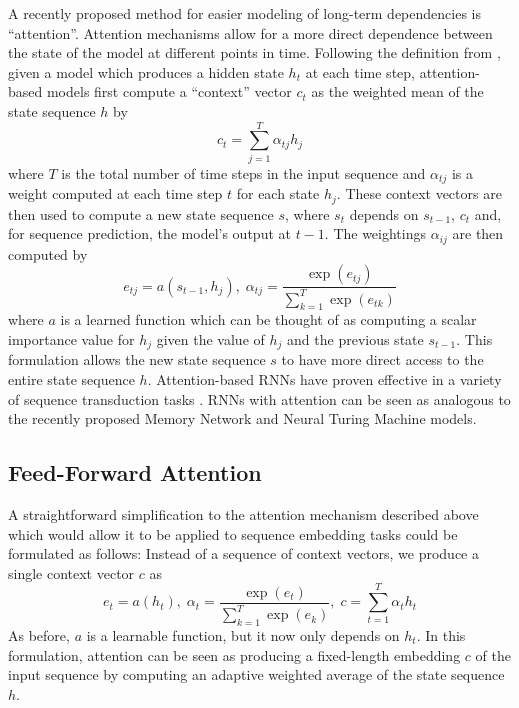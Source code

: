 \documentclass{article} %
\begin{document}
A recently proposed method for easier modeling of long-term dependencies is ``attention''.
Attention mechanisms allow for a more direct dependence between the state of the model at different points in time.
Following the definition from \cite{bahdanau2014neural}, given a model which produces a hidden state $h_t$ at each time step, attention-based models first compute a ``context'' vector $c_t$ as the weighted mean of the state sequence $h$ by
$$
c_t = \sum_{j = 1}^T \alpha_{tj} h_j
$$
where $T$ is the total number of time steps in the input sequence and $\alpha_{tj}$ is a weight computed at each time step $t$ for each state $h_j$.
These context vectors are then used to compute a new state sequence $s$, where $s_t$ depends on $s_{t - 1}$, $c_t$ and, for sequence prediction, the model's output at $t - 1$.
The weightings $\alpha_{ij}$ are then computed by
$$
e_{tj} = a(s_{t - 1}, h_j),\; \alpha_{tj} = \frac{\exp(e_{tj})}{\sum_{k = 1}^T \exp(e_{tk})}
$$
where $a$ is a learned function which can be thought of as computing a scalar importance value for $h_j$ given the value of $h_j$ and the previous state $s_{t - 1}$.
This formulation allows the new state sequence $s$ to have more direct access to the entire state sequence $h$.
Attention-based RNNs have proven effective in a variety of sequence transduction tasks \cite{bahdanau2014neural,cho2015describing}.
RNNs with attention can be seen as analogous to the recently proposed Memory Network \cite{weston2014memory,sukhbaatar2015end} and Neural Turing Machine \cite{graves2014neural} models.

\subsection{Feed-Forward Attention}

A straightforward simplification to the attention mechanism described above which would allow it to be applied to sequence embedding tasks could be formulated as follows:
Instead of a sequence of context vectors, we produce a single context vector $c$ as
\begin{equation}
\label{eq:ffattention}
 e_t = a(h_t),\; \alpha_t = \frac{\exp(e_t)}{\sum_{k = 1}^T \exp(e_k)}, \; c = \sum_{t = 1}^T \alpha_t h_t
\end{equation}
As before, $a$ is a learnable function, but it now only depends on $h_t$.
In this formulation, attention can be seen as producing a fixed-length embedding $c$ of the input sequence by computing an adaptive weighted average of the state sequence $h$.
\end{document}
